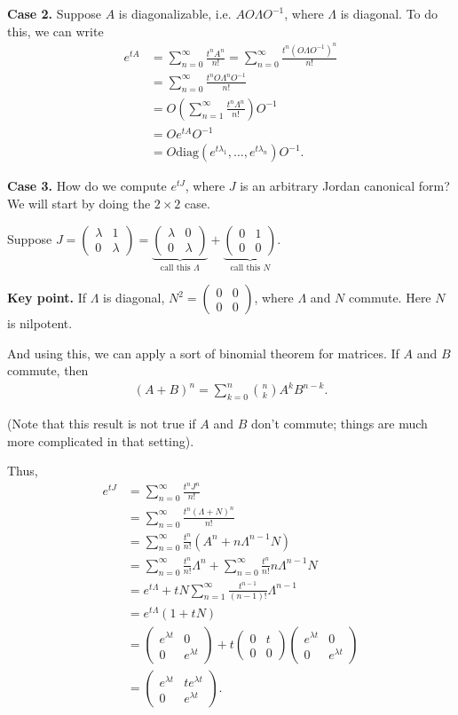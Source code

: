 \documentclass{article}
\newcommand{\mat}[1]{\begin{pmatrix}#1\end{pmatrix}}
\begin{document}
{\bf Case 2.} Suppose $A$ is diagonalizable, i.e. $A  O \Lambda O^{-1}$, where $\Lambda$ is diagonal.  To do this, we can write
\begin{align*}
  e^{tA} &= \sum_{n=0}^{\infty} \frac{t^n A^n}{n!} =  \sum_{n=0}^{\infty} \frac{t^n (O \Lambda O^{-1})^{n}}{n!} \\
  &= \sum_{n=0}^{\infty} \frac{t^n O \Lambda^n O^{-1}}{n!} \\
  &= O \left( \sum_{n=1}^{\infty} \frac{t^n \Lambda^n}{n!} \right) O^{-1} \\
  &= O e^{tA} O^{-1} \\
  &= O \text{diag}(e^{t \lambda_1}, \dots, e^{t \lambda_n}) O^{-1}.
\end{align*}

{\bf Case 3.} How do we compute $e^{tJ}$, where $J$ is an arbitrary Jordan canonical form?  We will start by doing the $2 \times 2$ case.

Suppose $J = \mat{\lambda & 1 \\ 0 & \lambda} = \underbrace{\mat{\lambda & 0 \\ 0 & \lambda}}_{\text{call this $\Lambda$}} + \underbrace{\mat{0 & 1 \\ 0 & 0}}_{\text{call this $N$}}$.

{\bf Key point.} If $\Lambda$ is diagonal, $N^2 = \mat{0 & 0 \\ 0 & 0}$, where $\Lambda$ and $N$ commute.  Here $N$ is nilpotent.

And using this, we can apply a sort of binomial theorem for matrices.  If $A$ and $B$ commute, then
\begin{align*}
  (A+B)^n = \sum_{k=0}^{n} \binom{n}{k} A^k B^{n-k}.
\end{align*}

(Note that this result is not true if $A$ and $B$ don't commute; things are much more complicated in that setting).

Thus,
\begin{align*}
  e^{tJ} &= \sum_{n=0}^{\infty} \frac{t^n J^n}{n!} \\
  &= \sum_{n=0}^{\infty} \frac{t^n (\Lambda + N)^n}{n!} \\
  &= \sum_{n=0}^{\infty} \frac{t^n}{n!} (A^n + n \Lambda^{n-1} N) \\
  &= \sum_{n=0}^{\infty} \frac{t^n}{n!} \Lambda^n + \sum_{n=0}^{\infty} \frac{t^n}{n!} n \Lambda^{n-1} N \\
  &= e^{t \Lambda} + t N \sum_{n=1}^{\infty} \frac{t^{n-1}}{(n-1)!} \Lambda^{n-1} \\
  &= e^{t \Lambda} (1 + tN) \\
  &= \mat{e^{\lambda t} & 0 \\ 0 & e^{\lambda t}} + t \mat{0 & t \\ 0 & 0 }\mat{e^{\lambda t} & 0 \\ 0 & e^{\lambda t}} \\
  &= \mat{e^{\lambda t} & t e^{\lambda t} \\ 0 & e^{\lambda t}}.
\end{align*}
\end{document}
